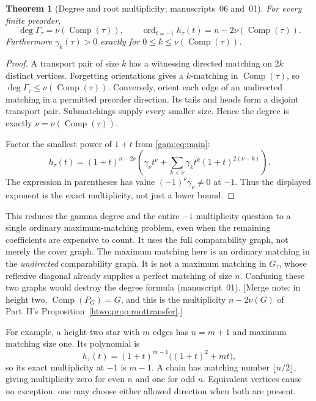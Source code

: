 \documentclass[11pt]{article}
\numberwithin{equation}{section}
\newtheorem{theorem}{Theorem}[section]
\theoremstyle{definition}
\newcommand{\Comp}{\operatorname{Comp}}
\newcommand{\ordm}{\operatorname{ord}}
\begin{document}
\begin{theorem}[Degree and root multiplicity; manuscripts~06 and~01]\label{gam:thm:deficiency}
For every finite preorder,
\begin{equation}
 \deg\Gamma_\tau=\nu(\Comp(\tau)),\qquad
 \ordm_{t=-1}h_\tau(t)=n-2\nu(\Comp(\tau)).
 \label{gam:eq:deficiency}
\end{equation}
Furthermore $\gamma_k(\tau)>0$ exactly for $0\le k\le\nu(\Comp(\tau))$.
\end{theorem}
\begin{proof}
A transport pair of size $k$ has a witnessing directed matching on $2k$
distinct vertices. Forgetting orientations gives a $k$-matching in
$\Comp(\tau)$, so $\deg\Gamma_\tau\le\nu(\Comp(\tau))$. Conversely, orient
each edge of an undirected matching in a permitted preorder direction. Its
tails and heads form a disjoint transport pair. Submatchings supply every
smaller size. Hence the degree is exactly $\nu=\nu(\Comp(\tau))$.

Factor the smallest power of $1+t$ from \eqref{gam:eq:main}:
\begin{equation}
 h_\tau(t)=(1+t)^{n-2\nu}
   \left(\gamma_\nu t^\nu+
    \sum_{k<\nu}\gamma_k t^k(1+t)^{2(\nu-k)}\right).
 \label{gam:eq:minusonefactor}
\end{equation}
The expression in parentheses has value $(-1)^\nu\gamma_\nu\ne0$ at $-1$.
Thus the displayed exponent is the exact multiplicity, not just a lower
bound.
\end{proof}
This reduces the gamma degree and the entire $-1$ multiplicity question to a
single ordinary maximum-matching problem, even when the remaining
coefficients are expensive to count. It uses the full comparability graph,
not merely the cover graph. The maximum matching here is an ordinary
matching in the \emph{undirected} comparability graph. It is not a maximum
matching in $G_\tau$, whose reflexive diagonal already supplies a perfect
matching of size $n$. Confusing these two graphs would destroy the degree
formula (manuscript~01). [Merge note: in height two, $\Comp(P_G)=G$, and
this is the multiplicity $n-2\nu(G)$ of Part~II's
Proposition~\ref{htwo:prop:roottransfer}.]

For example, a height-two star with $m$ edges has $n=m+1$ and maximum
matching size one. Its polynomial is
\[
 h_\tau(t)=(1+t)^{m-1}\bigl((1+t)^2+mt\bigr),
\]
so its exact multiplicity at $-1$ is $m-1$. A chain has matching number
$\lfloor n/2\rfloor$, giving multiplicity zero for even $n$ and one for odd
$n$. Equivalent vertices cause no exception: one may choose either
allowed direction when both are present.
\end{document}
